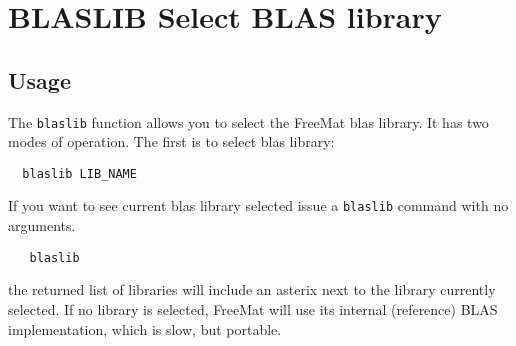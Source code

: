 \section{BLASLIB Select BLAS library}

\subsection{Usage}

The \verb|blaslib| function allows you to select the FreeMat blas library.
It has two modes of operation.  The first is to select blas library:
\begin{verbatim}
  blaslib LIB_NAME
\end{verbatim}
If you want to see current blas library selected
issue a \verb|blaslib| command with no arguments.
\begin{verbatim}
   blaslib
\end{verbatim}
the returned list of libraries will include an asterix next to the library
currently selected.  If no library is selected, FreeMat will use its internal
(reference) BLAS implementation, which is slow, but portable.
